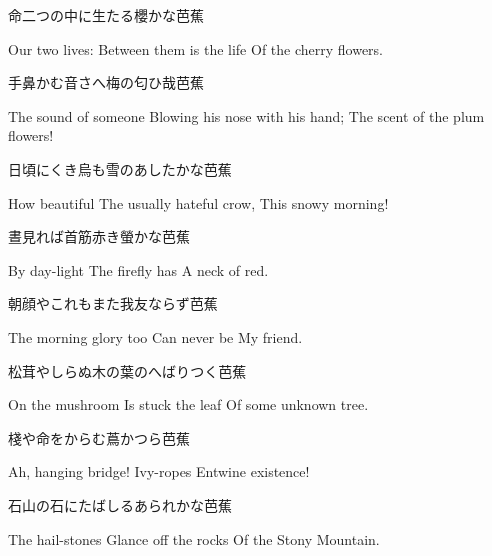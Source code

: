 \begin{haiku}
    {\FH 命二つの中に生たる櫻かな}\hfill{\FH 芭蕉}

    \vin{} Our two lives:
    \vin{} \vin{} Between them is the life
    \vin{} \vin{} \vin{} Of the cherry flowers.
\end{haiku}

\begin{haiku}
    {\FH 手鼻かむ音さへ梅の匂ひ哉}\hfill{\FH 芭蕉}

    \vin{} The sound of someone
    \vin{} \vin{} Blowing his nose with his hand;
    \vin{} \vin{} \vin{} The scent of the plum flowers!
\end{haiku}

\begin{haiku}
    {\FH 日頃にくき烏も雪のあしたかな}\hfill{\FH 芭蕉}

    \vin{} How beautiful
    \vin{} \vin{} The usually hateful crow,
    \vin{} \vin{} \vin{} This snowy morning!
\end{haiku}

\begin{haiku}
    {\FH 晝見れば首筋赤き螢かな}\hfill{\FH 芭蕉}

    \vin{} By day-light
    \vin{} \vin{} The firefly has
    \vin{} \vin{} \vin{} A neck of red.
\end{haiku}

\begin{haiku}
    {\FH 朝顔やこれもまた我友ならず}\hfill{\FH 芭蕉}

    \vin{} The morning glory too
    \vin{} \vin{} Can never be
    \vin{} \vin{} \vin{} My friend.
\end{haiku}

\begin{haiku}
    {\FH 松茸やしらぬ木の葉のへばりつく}\hfill{\FH 芭蕉}

    \vin{} On the mushroom
    \vin{} \vin{} Is stuck the leaf
    \vin{} \vin{} \vin{} Of some unknown tree.
\end{haiku}

\begin{haiku}
    {\FH 棧や命をからむ蔦かつら}\hfill{\FH 芭蕉}

    \vin{} Ah, hanging bridge!
    \vin{} \vin{} Ivy-ropes
    \vin{} \vin{} \vin{} Entwine existence!
\end{haiku}

\begin{haiku}
    {\FH 石山の石にたばしるあられかな}\hfill{\FH 芭蕉}

    \vin{} The hail-stones
    \vin{} \vin{} Glance off the rocks
    \vin{} \vin{} \vin{} Of the Stony Mountain.
\end{haiku}

